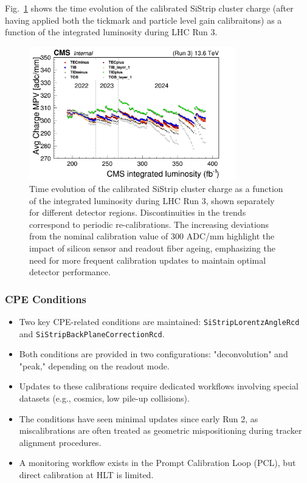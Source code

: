 Fig.~\ref{fig:StripClusterCharge} shows the time evolution of the calibrated SiStrip cluster charge (after having applied both the tickmark and particle level gain calibraitons) as a function of the integrated luminosity during LHC Run 3. 
 
\begin{figure}[htbp]
   \centering
	\includegraphics[width=0.8\textwidth]{figures/CalibratedCharge_run3_lumi.png}
   \caption{Time evolution of the calibrated SiStrip cluster charge as a function of the integrated luminosity during LHC Run 3, shown separately for different detector regions. Discontinuities in the trends correspond to periodic re-calibrations. The increasing deviations from the nominal calibration value of 300 ADC/mm highlight the impact of silicon sensor and readout fiber ageing, emphasizing the need for more frequent calibration updates to maintain optimal detector performance.}
   \label{fig:StripClusterCharge}
\end{figure}

\subsubsection{CPE Conditions}

\begin{itemize}
    \item Two key CPE-related conditions are maintained:\newline
    \texttt{SiStripLorentzAngleRcd} and \texttt{SiStripBackPlaneCorrectionRcd}.
    \item Both conditions are provided in two configurations: "deconvolution" and "peak," depending on the readout mode.
    \item Updates to these calibrations require dedicated workflows involving special datasets (e.g., cosmics, low pile-up collisions).
    \item The conditions have seen minimal updates since early Run 2, as miscalibrations are often treated as geometric mispositioning during tracker alignment procedures.
    \item A monitoring workflow exists in the Prompt Calibration Loop (PCL), but direct calibration at HLT is limited.
\end{itemize}

